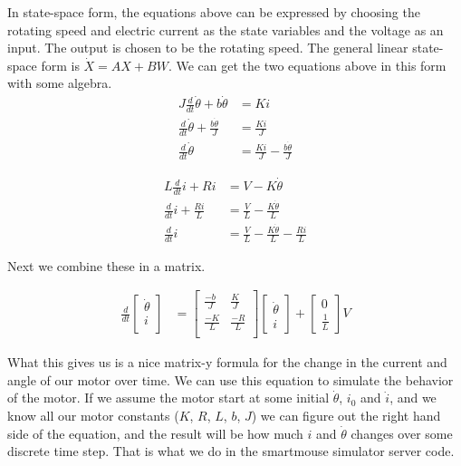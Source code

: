 \documentclass{article}
\begin{document}
In state-space form, the equations above can be expressed by choosing the rotating speed and electric current as the state variables and the voltage as an input. The output is chosen to be the rotating speed. The general linear state-space form is $\dot{X} = AX + BW$. We can get the two equations above in this form with some algebra.
\begin{align}
  J\frac{d}{dt}\dot{\theta} + b\dot{\theta} &= Ki \\
  \frac{d}{dt}\dot{\theta} + \frac{b\dot{\theta}}{J} &= \frac{Ki}{J} \\
  \frac{d}{dt}\dot{\theta} &= \frac{Ki}{J} - \frac{b\dot{\theta}}{J}
\end{align}

\begin{align}
  L\frac{d}{dt}i + Ri &= V - K\dot{\theta} \\
  \frac{d}{dt}i + \frac{Ri}{L} &= \frac{V}{L} - \frac{K\dot{\theta}}{L} \\
  \frac{d}{dt}i &= \frac{V}{L} - \frac{K\dot{\theta}}{L} - \frac{Ri}{L}
\end{align}

Next we combine these in a matrix.

\begin{align}
  \frac{d}{dt}\begin{bmatrix}\dot{\theta}\\i\\\end{bmatrix} &=
    \begin{bmatrix}
      \frac{-b}{J} & \frac{K}{J} \\
      \frac{-K}{L} & \frac{-R}{L} \\
    \end{bmatrix}
    \begin{bmatrix}
      \dot{\theta} \\
      i
    \end{bmatrix}
    +
    \begin{bmatrix}
      0 \\
      \frac{1}{L}
    \end{bmatrix}
    V
\end{align}

What this gives us is a nice matrix-y formula for the change in the current and angle of our motor over time. We can use this equation to simulate the behavior of the motor. If we assume the motor start at some initial $\dot{\theta}$, $i_0$ and $\dot{i}$, and we know all our motor constants ($K$, $R$, $L$, $b$, $J$) we can figure out the right hand side of the equation, and the result will be how much $i$ and $\dot{\theta}$ changes over some discrete time step. That is what we do in the smartmouse simulator server code.
\end{document}
